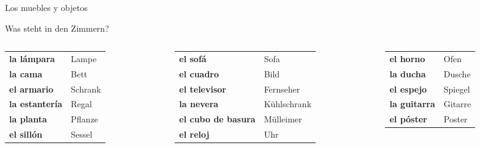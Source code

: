 \documentclass[aspectratio=169, 11pt]{beamer}
\newcommand{\seriftext}[1]{{\fontfamily{ppl}\selectfont #1}}
\newcommand{\es}[1]{\seriftext{\textbf{#1}}}
\begin{document}
\begin{frame}{Los muebles y objetos}
    \vspace{0.2cm}

    {\large Was steht in den Zimmern?}

    \vspace{0.3cm}

    \begin{columns}[T]
        \begin{column}{0.3\textwidth}
            {\small
            \begin{tabular}{@{}ll@{}}
                \es{la lámpara} & Lampe \\[0.2em]
                \es{la cama} & Bett \\[0.2em]
                \es{el armario} & Schrank \\[0.2em]
                \es{la estantería} & Regal \\[0.2em]
                \es{la planta} & Pflanze \\[0.2em]
                \es{el sillón} & Sessel \\
            \end{tabular}}
        \end{column}

        \begin{column}{0.3\textwidth}
            {\small
            \begin{tabular}{@{}ll@{}}
                \es{el sofá} & Sofa \\[0.2em]
                \es{el cuadro} & Bild \\[0.2em]
                \es{el televisor} & Fernseher \\[0.2em]
                \es{la nevera} & Kühlschrank \\[0.2em]
                \es{el cubo de basura} & Mülleimer \\[0.2em]
                \es{el reloj} & Uhr \\
            \end{tabular}}
        \end{column}

        \begin{column}{0.3\textwidth}
            {\small
            \begin{tabular}{@{}ll@{}}
                \es{el horno} & Ofen \\[0.2em]
                \es{la ducha} & Dusche \\[0.2em]
                \es{el espejo} & Spiegel \\[0.2em]
                \es{la guitarra} & Gitarre \\[0.2em]
                \es{el póster} & Poster \\
            \end{tabular}}
        \end{column}
    \end{columns}
\end{frame}
\end{document}
